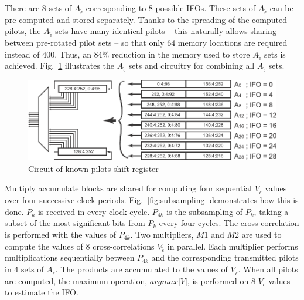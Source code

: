 There are 8 sets of $A_{\tilde{\epsilon}}$ corresponding to 8 possible IFOs.
These sets of $A_{\tilde{\epsilon}}$ can be pre-computed and stored separately.
Thanks to the spreading of the computed pilots, the $A_{\tilde{\epsilon}}$ sets have many identical pilots -- this naturally allows sharing between pre-rotated pilot sets -- so that only 64 memory locations are required instead of 400. Thus, an 84\% reduction in the memory used to store $A_{\tilde{\epsilon}}$ sets is achieved.
Fig.~\ref{fig:Pilots} illustrates the $A_{\tilde{\epsilon}}$ sets and circuitry for combining all $A_{\tilde{\epsilon}}$ sets.
\begin{figure}
	\centerline{\includegraphics [width=1\columnwidth] {figures/Pilots.pdf} }
	\caption{Circuit of known pilots shift register} 
	\label{fig:Pilots}
\end{figure}

Multiply accumulate blocks are shared for computing four sequential $V_{\tilde{\epsilon}}$ values over four successive clock periods. Fig.~\ref{fig:subsampling} demonstrates how this is done. $P_k$ is received in every clock cycle. $P_{4k}$ is the subsampling of $P_k$, taking a subset of the most significant bits from $P_k$ every four cycles. The cross-correlation is performed with the values of $P_{4k}$. Two multipliers, $M1$ and $M2$ are used to compute the values of 8 cross-correlations $V_{\tilde{\epsilon}}$ in parallel. Each multiplier performs multiplications sequentially between $P_{4k}$ and the corresponding transmitted pilots in 4 sets of $A_{\tilde{\epsilon}}$. The products are accumulated to the values of $V_{\tilde{\epsilon}}$. When all pilots are computed, the maximum operation, $argmax|V|$, is performed on 8 $V_{\tilde{\epsilon}}$ values to estimate the IFO.

